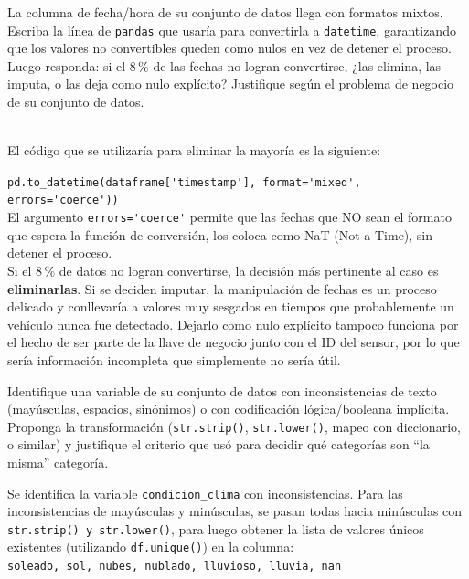 \documentclass[11pt]{article}
\begin{document}
\begin{pregunta}
La columna de fecha/hora de su conjunto de datos llega con formatos mixtos. Escriba la línea de \texttt{pandas} que usaría para convertirla a \texttt{datetime}, garantizando que los valores no convertibles queden como nulos en vez de detener el proceso. Luego responda: si el 8\,\% de las fechas no logran convertirse, ¿las elimina, las imputa, o las deja como nulo explícito? Justifique según el problema de negocio de su conjunto de datos.
\end{pregunta} \\

El código que se utilizaría para eliminar la mayoría es la siguiente:

\verb|pd.to_datetime(dataframe['timestamp'], format='mixed', errors='coerce'))|\\

El argumento \verb|errors='coerce'| permite que las fechas que NO sean el formato que espera la función de conversión, los coloca como NaT (Not a Time), sin detener el proceso.\\

Si el 8\,\% de datos no logran convertirse, la decisión más pertinente al caso es \textbf{eliminarlas}. Si se deciden imputar, la manipulación de fechas es un proceso delicado y conllevaría a valores muy sesgados en tiempos que probablemente un vehículo nunca fue detectado. Dejarlo como nulo explícito tampoco funciona por el hecho de ser parte de la llave de negocio junto con el ID del sensor, por lo que sería información incompleta que simplemente no sería útil.
\begin{pregunta}
Identifique una variable de su conjunto de datos con inconsistencias de texto (mayúsculas, espacios, sinónimos) o con codificación lógica/booleana implícita. Proponga la transformación (\texttt{str.strip()}, \texttt{str.lower()}, mapeo con diccionario, o similar) y justifique el criterio que usó para decidir qué categorías son ``la misma'' categoría.
\end{pregunta}

Se identifica la variable \verb|condicion_clima| con inconsistencias. Para las inconsistencias de mayúsculas y minúsculas, se pasan todas hacia minúsculas con \verb|str.strip() y str.lower()|, para luego obtener la lista de valores únicos existentes (utilizando \verb|df.unique()|) en la columna:\\


\verb|soleado, sol, nubes, nublado, lluvioso, lluvia, nan|\\
\end{document}
